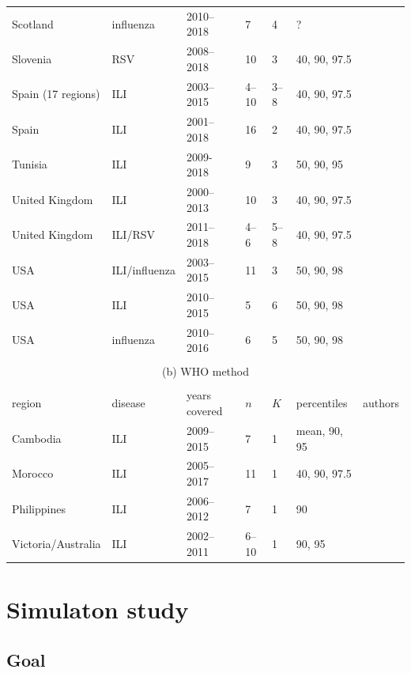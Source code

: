 \documentclass{article}
\begin{document}
\begin{table}
\begin{tabular}{l l l l l l l}
Scotland & influenza & 2010--2018 & 7 & 4 & ? & \cite{Murray2018}\\
Slovenia & RSV & 2008--2018 & 10 & 3 & 40, 90, 97.5 & \cite{Grilc2020}\\
Spain (17 regions) & ILI & 2003--2015 & 4--10 & 3--8 & 40, 90, 97.5 & \cite{Bangert2017}\\
Spain & ILI & 2001--2018 & 16 & 2 & 40, 90, 97.5 & \cite{RedondoBravo2020}\\
Tunisia & ILI & 2009-2018 & 9 & 3 & 50, 90, 95 & \cite{Bouguerra2020}\\
United Kingdom & ILI & 2000--2013 & 10 & 3 & 40, 90, 97.5 & \cite{Green2015}\\
United Kingdom & ILI/RSV & 2011--2018 & 4--6 & 5--8 & 40, 90, 97.5 & \cite{Harcourt2019}\\
USA & ILI/influenza & 2003--2015 & 11 & 3 & 50, 90, 98 & \cite{Biggerstaff2017}\\
USA & ILI & 2010--2015 & 5 & 6 & 50, 90, 98 & \cite{Dahlgren2018}\\
USA & influenza & 2010--2016 & 6 & 5 & 50, 90, 98 & \cite{Dahlgren2019}\\
\bottomrule\\
\multicolumn{7}{c}{(b) WHO method}\\ \\
\toprule
region & disease & years covered & $n$ & $K$ & percentiles & authors\\
\midrule
Cambodia & ILI & 2009--2015 & 7 & 1 & mean, 90, 95 & \cite{Ly2017}\\
Morocco & ILI & 2005--2017 & 11 & 1 & 40, 90, 97.5 & \cite{Rguig2020}\\
Philippines & ILI & 2006--2012 & 7 & 1 & 90 & \cite{Lucero2016}\\
Victoria/Australia & ILI & 2002--2011 & 6--10 & 1 & 90, 95 & \cite{Tay2013}\\
\end{tabular}
\end{table}




\section{Simulaton study}
\label{sec:simulation}

\subsection{Goal}
\label{subsec:simulation_goal}
\end{document}
